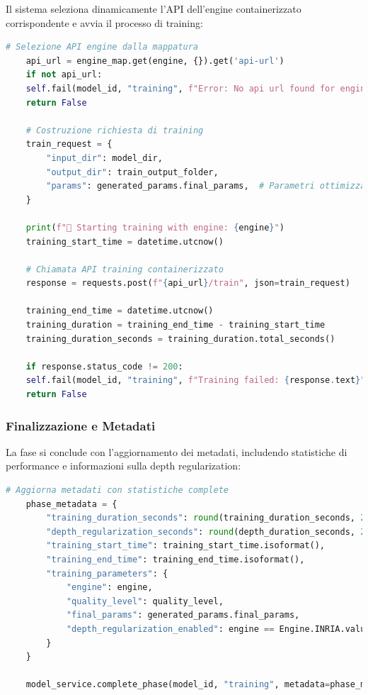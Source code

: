 Il sistema seleziona dinamicamente l'API dell'engine containerizzato corrispondente e avvia il processo di training:

\begin{lstlisting}[language=python, caption=Esecuzione training con engine selezionato]
	# Selezione API engine dalla mappatura
	api_url = engine_map.get(engine, {}).get('api-url')
	if not api_url:
	self.fail(model_id, "training", f"Error: No api url found for engine {engine}")
	return False
	
	# Costruzione richiesta di training
	train_request = {
		"input_dir": model_dir,
		"output_dir": train_output_folder,
		"params": generated_params.final_params,  # Parametri ottimizzati
	}
	
	print(f"🎯 Starting training with engine: {engine}")
	training_start_time = datetime.utcnow()
	
	# Chiamata API training containerizzato
	response = requests.post(f"{api_url}/train", json=train_request)
	
	training_end_time = datetime.utcnow()
	training_duration = training_end_time - training_start_time
	training_duration_seconds = training_duration.total_seconds()
	
	if response.status_code != 200:
	self.fail(model_id, "training", f"Training failed: {response.text}")
	return False
\end{lstlisting}

\subsubsection{Finalizzazione e Metadati}

La fase si conclude con l'aggiornamento dei metadati, includendo statistiche di performance e informazioni sulla depth regularization:

\begin{lstlisting}[language=python, caption=Finalizzazione training con metadati estesi]
	# Aggiorna metadati con statistiche complete
	phase_metadata = {
		"training_duration_seconds": round(training_duration_seconds, 2),
		"depth_regularization_seconds": round(depth_duration_seconds, 2),
		"training_start_time": training_start_time.isoformat(),
		"training_end_time": training_end_time.isoformat(),
		"training_parameters": {
			"engine": engine,
			"quality_level": quality_level,
			"final_params": generated_params.final_params,
			"depth_regularization_enabled": engine == Engine.INRIA.value
		}
	}
	
	model_service.complete_phase(model_id, "training", metadata=phase_metadata)
\end{lstlisting}

